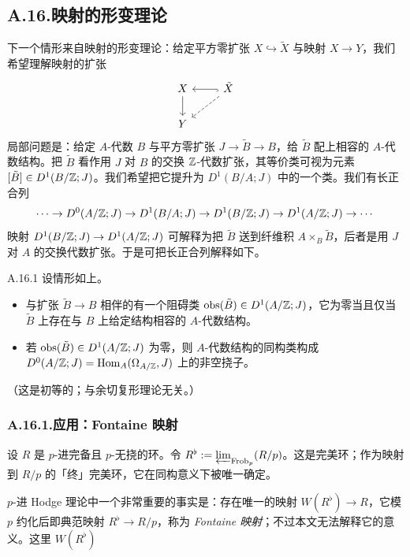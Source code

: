 \subsection*{A.16.\quad 映射的形变理论}

下一个情形来自映射的形变理论：给定平方零扩张 $X\hookrightarrow\tilde X$ 与映射 $X\to Y$，我们希望理解映射的扩张
\[
\begin{tikzcd}
X \arrow[d] & \tilde X \arrow[l, hook] \arrow[dl, dashed] \\
Y
\end{tikzcd}
\]
局部问题是：给定 $A$-代数 $B$ 与平方零扩张 $J\to\tilde B\to B$，给 $\tilde B$ 配上相容的 $A$-代数结构。把 $\tilde B$ 看作用 $J$ 对 $B$ 的交换 $\mathbb{Z}$-代数扩张，其等价类可视为元素 $[\tilde B]\in D^1(B/\mathbb{Z};J)$。我们希望把它提升为 $D^1(B/A;J)$ 中的一个类。我们有长正合列
\[
\cdots\to D^0(A/\mathbb{Z};J)\to D^1(B/A;J)\to D^1(B/\mathbb{Z};J)\to D^1(A/\mathbb{Z};J)\to\cdots
\]
映射 $D^1(B/\mathbb{Z};J)\to D^1(A/\mathbb{Z};J)$ 可解释为把 $\tilde B$ 送到纤维积 $A\times_B\tilde B$，后者是用 $J$ 对 $A$ 的交换代数扩张。于是可把长正合列解释如下。

\begin{prop}{A.16.1}\label{thm:a6-08-9}
设情形如上。
\begin{itemize}
\item 与扩张 $\tilde B\to B$ 相伴的有一个阻碍类 $\mathrm{obs}(\tilde B)\in D^1(A/\mathbb{Z};J)$，它为零当且仅当 $\tilde B$ 上存在与 $B$ 上给定结构相容的 $A$-代数结构。
\item 若 $\mathrm{obs}(\tilde B)\in D^1(A/\mathbb{Z};J)$ 为零，则 $A$-代数结构的同构类构成 $D^0(A/\mathbb{Z};J)=\operatorname{Hom}_A(\Omega_{A/\mathbb{Z}},J)$ 上的非空挠子。
\end{itemize}
（这是初等的；与余切复形理论无关。）
\end{prop}

\subsubsection*{A.16.1.\quad 应用：Fontaine 映射}

设 $R$ 是 $p$-进完备且 $p$-无挠的环。令 $R^\flat:=\varprojlim_{\operatorname{Frob}_p}(R/p)$。这是完美环；作为映射到 $R/p$ 的「终」完美环，它在同构意义下被唯一确定。

$p$-进 Hodge 理论中一个非常重要的事实是：存在唯一的映射 $W(R^\flat)\to R$，它模 $p$ 约化后即典范映射 $R^\flat\to R/p$，称为 \emph{Fontaine 映射}；不过本文无法解释它的意义。这里 $W(R^\flat)$


